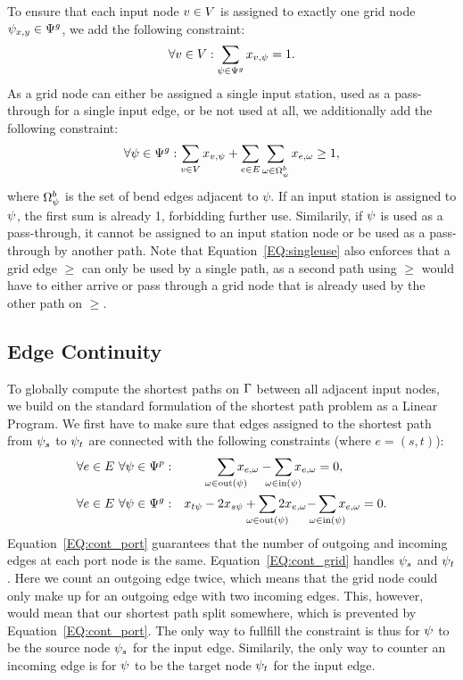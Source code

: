 \documentclass[sigconf]{acmart}
\begin{document}
To ensure that each input node $v \in V$ is assigned to exactly one grid node $\psi_{x, y} \in \Psi^g$, we add the following constraint:
%
\begin{equation}
  \forall v \in V: \sum_{\psi \in \Psi^g} x_{v,\psi} = 1. \label{EQ:onegvperiv}
\end{equation}
%
As a grid node can either be assigned a single input station, used as a pass-through for a single input edge, or be not used at all, we additionally add the following constraint:
%
\begin{equation}
  \forall \psi \in \Psi^g: \sum_{v \in V} x_{v,\psi} + \sum_{e \in E} \sum_{\omega \in \Omega^b_\psi} x_{e,\omega} \geq 1, \label{EQ:singleuse}
\end{equation}
%
where $\Omega^b_\psi$ is the set of bend edges adjacent to $\psi$. 
If an input station is assigned to $\psi$, the first sum is already 1, forbidding further use.
Similarily, if $\psi$ is used as a pass-through, it cannot be assigned to an input station node or be used as a pass-through by another path.
Note that Equation~\ref{EQ:singleuse} also enforces that a grid edge $\ge$ can only be used by a single path, as a second path using $\ge$ would have to either arrive or pass through a grid node that is already used by the other path on $\ge$.

\subsection{Edge Continuity}

To globally compute the shortest paths on $\Gamma$ between all adjacent input nodes, we build on the standard formulation of the shortest path problem as a Linear Program.
We first have to make sure that edges assigned to the shortest path from $\psi_s$ to $\psi_t$ are connected with the following constraints (where $e = (s, t)$):
%
\newcommand\Psum[1]{\sum_{\makebox[0pt]{$\scriptstyle#1$}}}
%
\begin{align}
	&\forall \ie \in \iE\ \forall \gv \in \gV^p:& \Psum{\ge \in \text{out}(\gv)} \geused{\ie}{\ge} - \Psum{\ge \in \text{in}(\gv)} \geused{\ie}{\ge}& = 0, \label{EQ:cont_port} \\
	&\forall \ie \in \iE\ \forall \gv \in \gV^g:& x_{t\psi} - 2x_{s\psi} + \Psum{\ge \in \text{out}(\gv)} 2\geused{\ie}{\ge} - &\Psum{\ge \in \text{in}(\gv)} \geused{\ie}{\ge} = 0. \label{EQ:cont_grid}
\end{align}
%
Equation~\ref{EQ:cont_port} guarantees that the number of outgoing and incoming edges at each port node is the same.
%
Equation~\ref{EQ:cont_grid} handles $\psi_s$ and $\psi_t$.
Here we count an outgoing edge twice, which means that the grid node could only make up for an outgoing edge with two incoming edges.
This, however, would mean that our shortest path split somewhere, which is prevented by Equation~\ref{EQ:cont_port}.
The only way to fullfill the constraint is thus for $\psi$ to be the source node $\psi_s$ for the input edge.
Similarily, the only way to counter an incoming edge is for $\psi$ to be the target node $\psi_t$ for the input edge.
\end{document}
